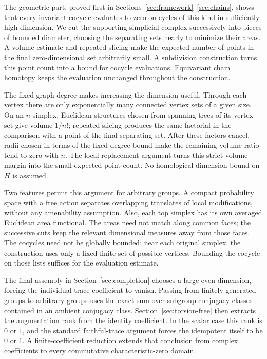 The geometric part, proved first in Sections~\ref{sec:framework}--\ref{sec:chains},
shows that every invariant cocycle evaluates to zero on cycles of this
kind in sufficiently high dimension. We cut the supporting simplicial
complex successively into pieces of bounded diameter, choosing the
separating sets nearly to minimize their areas. A volume estimate and
repeated slicing make the expected number of points in the final
zero-dimensional set arbitrarily small. A subdivision construction turns
this point count into a bound for cocycle evaluations. Equivariant chain
homotopy keeps the evaluation unchanged throughout the construction.

The fixed graph degree makes increasing the dimension useful. Through
each vertex there are only exponentially many connected vertex sets of a
given size. On an $n$-simplex, Euclidean structures chosen from spanning
trees of its vertex set give volume $1/n!$; repeated slicing produces the
same factorial in the comparison with a point of the final separating
set. After these factors cancel, radii chosen in terms of the fixed
degree bound make the remaining volume ratio tend to zero with $n$.
The local replacement argument turns this strict volume margin into the
small expected point count. No homological-dimension bound on $H$ is
assumed.

Two features permit this argument for arbitrary groups. A compact
probability space with a free action separates overlapping translates of
local modifications, without any amenability assumption. Also, each top
simplex has its own averaged Euclidean area functional. The areas need
not match along common faces; the successive cuts keep the relevant
dimensional measures away from those faces.
The cocycles need not be globally bounded: near each original simplex,
the construction uses only a fixed finite set of possible vertices.
Bounding the cocycle on those lists suffices for the evaluation estimate.

The final assembly in Section~\ref{sec:completion} chooses a large even
dimension, forcing the individual trace coefficient to vanish. Passing
from finitely generated groups to arbitrary groups uses the exact sum
over subgroup conjugacy classes contained in an ambient conjugacy class.
Section~\ref{sec:torsion-free} then extracts the augmentation rank from
the identity coefficient. In the scalar case this rank is $0$ or $1$,
and the standard faithful-trace argument forces the idempotent itself
to be $0$ or $1$. A finite-coefficient reduction extends that conclusion
from complex coefficients to every commutative characteristic-zero domain.

